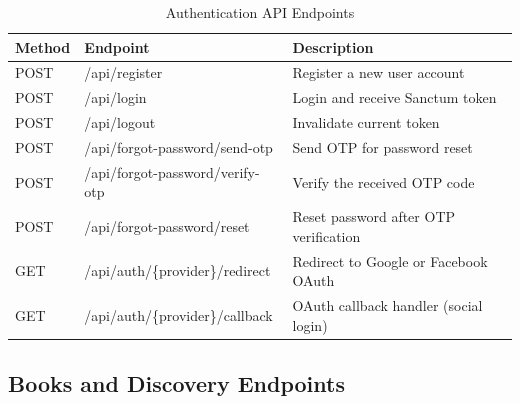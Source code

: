 \begin{table}[H]
\centering
\caption{Authentication API Endpoints}
\begin{tabularx}{\textwidth}{|l|l|X|}
\hline
\textbf{Method} & \textbf{Endpoint} & \textbf{Description} \\
\hline
POST & /api/register                    & Register a new user account \\
\hline
POST & /api/login                       & Login and receive Sanctum token \\
\hline
POST & /api/logout                      & Invalidate current token \\
\hline
POST & /api/forgot-password/send-otp    & Send OTP for password reset \\
\hline
POST & /api/forgot-password/verify-otp  & Verify the received OTP code \\
\hline
POST & /api/forgot-password/reset       & Reset password after OTP verification \\
\hline
GET  & /api/auth/\{provider\}/redirect  & Redirect to Google or Facebook OAuth \\
\hline
GET  & /api/auth/\{provider\}/callback  & OAuth callback handler (social login) \\
\hline
\end{tabularx}
\end{table}

\subsection{Books and Discovery Endpoints}

